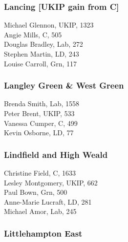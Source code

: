 \documentclass[a4paper,openany,10pt]{book}
\begin{document}
\subsubsection*{Lancing \hspace*{\fill}\nolinebreak[1]%
\enspace\hspace*{\fill}
[UKIP gain from C]}



Michael Glennon, UKIP, 1323\\
Angie Mills, C, 505\\
Douglas Bradley, Lab, 272\\
Stephen Martin, LD, 243\\
Louise Carroll, Grn, 117\\


\subsubsection*{Langley Green \& West Green}



Brenda Smith, Lab, 1558\\
Peter Brent, UKIP, 533\\
Vanessa Cumper, C, 499\\
Kevin Osborne, LD, 77\\


\subsubsection*{Lindfield and High Weald}



Christine Field, C, 1633\\
Lesley Montgomery, UKIP, 662\\
Paul Bown, Grn, 500\\
Anne-Marie Lucraft, LD, 281\\
Michael Amor, Lab, 245\\


\subsubsection*{Littlehampton East}

\end{document}

